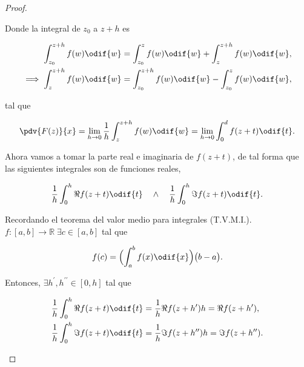 \documentclass[../main.tex]{subfiles}
\begin{document}
\begin{proof}
\begin{enumerate}[label=""]
            Donde la integral de \(z_{0}\) a \(z +  h\) es

            \begin{align*}
                \int_{z_{0}}^{z + h}f(w)\odif{w} &=
                \int_{z_{0}}^{z}f(w)\odif{w} + \int_{z}^{z +
                h}f(w)\odif{w},\nonumber\\
                \implies \int_{z}^{z + h}f(w)\odif{w} &= \int_{z_{0}}^{z +
                h}f(w)\odif{w} -
                \int_{z_{0}}^{z}f(w)\odif{w},
            \end{align*}

            tal que

            \begin{equation*}
                \pdv{F(z)}{x} = \lim_{h\to 0}\dfrac{1}{h}\int_{z}^{z +
                h}f(w)\odif{w} = \lim_{h\to
                0}\int_{0}^{d}f(z + t)\odif{t}.
            \end{equation*}

            Ahora vamos a tomar la parte real e imaginaria de \(f(z + t)\),
            de tal forma que las
            siguientes integrales son de funciones reales,

            \begin{equation*}
                \dfrac{1}{h}\int_{0}^{h}\Re f(z + t)\odif{t}\quad \wedge\quad
                \dfrac{1}{h}\int_{0}^{h}\Im f(z + t)\odif{t}.
            \end{equation*}

            Recordando el teorema del valor medio para integrales (T.V.M.I.). \(f \colon
            [a, b] \to \mathbb{R}\;\exists c\in[a, b]\) tal que

            \begin{equation*}
                f(c) = \Bigl(\int_{a}^{b}f(x)\odif{x}\Bigr)\bigl(b - a\bigr).
            \end{equation*}

            Entonces, \(\exists h^{\prime}, h^{\prime\prime}\in[0, h]\) tal que

            \begin{align*}
                \dfrac{1}{h} \int_{0}^{h}\Re f(z + t)\odif{t} &=
                \dfrac{1}{h}\Re f(z + h^{\prime})h =
                \Re f(z + h^{\prime}),\\
                \dfrac{1}{h} \int_{0}^{h}\Im f(z + t)\odif{t} &=
                \dfrac{1}{h}\Im f(z + h^{\prime\prime})h =
                \Im f(z + h^{\prime\prime}).
            \end{align*}


\end{enumerate}
\end{proof}
\end{document}
